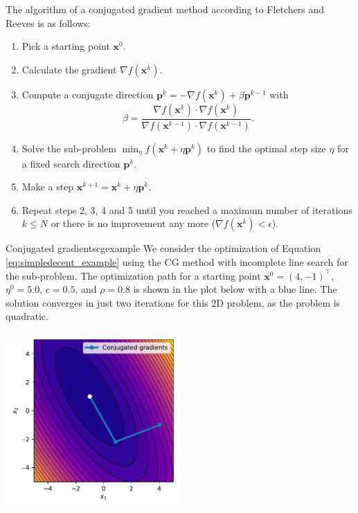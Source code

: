 The algorithm of a conjugated gradient method according to Fletchers and Reeves \cite{Fletcher1964} is as follows: 
\begin{enumerate}
    \item Pick a starting point $\mathbf{x}^0$.
    \item Calculate the gradient $\nabla f(\mathbf{x}^k)$.
    \item Compute a conjugate direction $\mathbf{p}^k = -\nabla f(\mathbf{x}^k) + \beta \mathbf{p}^{k-1}$ with  
    \begin{equation}
        \beta = \frac{\nabla f(\mathbf{x}^k) \cdot \nabla f(\mathbf{x}^k)}{\nabla f(\mathbf{x}^{k-1}) \cdot \nabla f(\mathbf{x}^{k-1})}.
    \end{equation}
    \item Solve the sub-problem $\min_{\eta} f(\mathbf{x}^k + \eta \mathbf{p}^k)$ to find the optimal step size $\eta$ for a fixed search direction $\mathbf{p}^k$.
    \item Make a step $\mathbf{x}^{k+1} = \mathbf{x}^k + \eta \mathbf{p}^k$.
    \item Repeat steps 2, 3, 4 and 5 until you reached a maximum number of iterations $k \le N$ or there is no improvement any more ($ \nabla f(\mathbf{x}^k) < \epsilon$). 
\end{enumerate}

\begin{example}{Conjugated gradients}{cgexample}
    We consider the optimization of Equation \eqref{eq:simpledecent_example} using the CG method with incomplete line search for the sub-problem. The optimization path for a starting point $\mathbf{x}^0= (4, -1)^\top$, $\eta^0=5.0$, $c=0.5$, and $\rho=0.8$ is shown in the plot below with a blue line. The solution converges in just two iterations for this 2D problem, as the problem is quadratic.
    \begin{center}
        \includegraphics[width=0.5\textwidth]{figures/cg.pdf}
    \end{center}   
\end{example}

